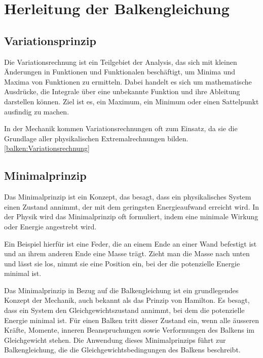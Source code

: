 %
%
%
%
\section{Herleitung der Balkengleichung
	\label{balken:section:teil2}}
\subsection{Variationsprinzip}
Die Variationsrechnung ist ein Teilgebiet der Analysis, das sich mit kleinen Änderungen in Funktionen und Funktionalen beschäftigt, um Minima und Maxima von Funktionen zu ermitteln. Dabei handelt es sich um mathematische Ausdrücke, die Integrale über eine unbekannte Funktion und ihre Ableitung darstellen können. Ziel ist es, ein Maximum, ein Minimum oder einen Sattelpunkt ausfindig zu machen.

In der Mechanik kommen Variationsrechnungen oft zum Einsatz, da sie die Grundlage aller physikalischen Extremalrechnungen bilden. \ref{balken:Variationsrechnung}

\subsection{Minimalprinzip}
Das Minimalprinzip ist ein Konzept, das besagt, dass ein physikalisches System einen Zustand annimmt, der mit dem geringsten Energieaufwand erreicht wird. In der Physik wird das Minimalprinzip oft formuliert, indem eine minimale Wirkung oder Energie angestrebt wird.

Ein Beispiel hierfür ist eine Feder, die an einem Ende an einer Wand befestigt ist und an ihrem anderen Ende eine Masse trägt. Zieht man die Masse nach unten und lässt sie los, nimmt sie eine Position ein, bei der die potenzielle Energie minimal ist.

Das Minimalprinzip in Bezug auf die Balkengleichung ist ein grundlegendes Konzept der Mechanik, auch bekannt als das Prinzip von Hamilton. Es besagt, dass ein System den Gleichgewichtszustand annimmt, bei dem die potenzielle Energie minimal ist. Für einen Balken tritt dieser Zustand ein, wenn alle äusseren Kräfte, Momente, inneren Beanspruchungen sowie Verformungen des Balkens im Gleichgewicht stehen. Die Anwendung dieses Minimalprinzips führt zur Balkengleichung, die die Gleichgewichtsbedingungen des Balkens beschreibt. 

